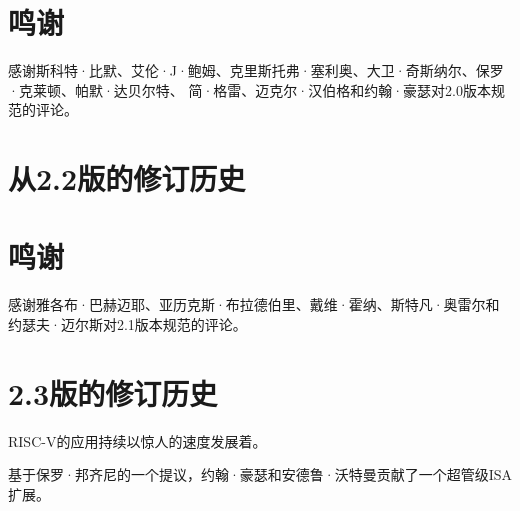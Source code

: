 \section*{鸣谢}

感谢斯科特·比默、艾伦·J·鲍姆、克里斯托弗·塞利奥、大卫·奇斯纳尔、保罗·克莱顿、帕默·达贝尔特、
简·格雷、迈克尔·汉伯格和约翰·豪瑟对2.0版本规范的评论。

\section{从2.2版的修订历史}

\section*{鸣谢}

感谢雅各布·巴赫迈耶、亚历克斯·布拉德伯里、戴维·霍纳、斯特凡·奥雷尔和约瑟夫·迈尔斯对2.1版本规范的评论。

\section{2.3版的修订历史}

RISC-V的应用持续以惊人的速度发展着。

基于保罗·邦齐尼的一个提议，约翰·豪瑟和安德鲁·沃特曼贡献了一个超管级ISA扩展。

